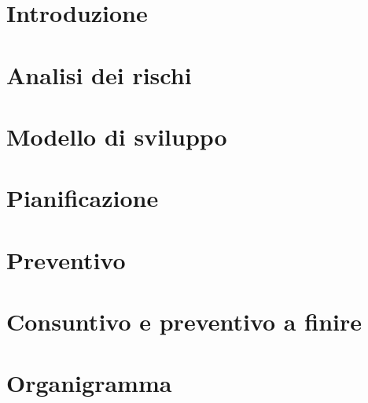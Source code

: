 \documentclass[11pt,a4paper]{article}
\begin{document}
	\section{Introduzione}
			
		\newpage	
	
	\section{Analisi dei rischi}
		
		\newpage	

	\section{Modello di sviluppo}
		
		\newpage	

	\section{Pianificazione}
		
		\newpage
				
	\section{Preventivo}
		
		\newpage
				
	\section{Consuntivo e preventivo a finire}
		
		\newpage
		
	\appendix
	\section{Organigramma}
		
\end{document}
